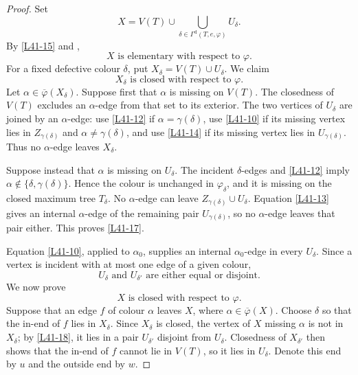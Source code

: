 \documentclass[11pt]{article}
\theoremstyle{definition}
\newcommand{\Dcol}{\Gamma^{\mathrm d}}
\newcommand{\set}[1]{\{#1\}}
\begin{document}
\begin{proof}
Set
\[
 X=V(T)\cup
   \bigcup_{\delta\in\Dcol(T,e,\varphi)}U_\delta.
\]
By \eqref{L41-15} and ,
\begin{equation}
 X\text{ is elementary with respect to }\varphi.
 \tag{16}\label{L41-16}
\end{equation}
For a fixed defective colour $\delta$, put
$X_\delta=V(T)\cup U_\delta$. We claim
\begin{equation}
 X_\delta\text{ is closed with respect to }\varphi.
 \tag{17}\label{L41-17}
\end{equation}
Let $\alpha\in\overline\varphi(X_\delta)$. Suppose first that $\alpha$ is
missing on $V(T)$. The closedness of $V(T)$ excludes an $\alpha$-edge from
that set to its exterior. The two vertices of $U_\delta$ are joined by an
$\alpha$-edge: use \eqref{L41-12} if
$\alpha=\gamma(\delta)$, use \eqref{L41-10} if its missing vertex lies in
$Z_{\gamma(\delta)}$ and $\alpha\ne\gamma(\delta)$, and use
\eqref{L41-14} if its missing vertex lies in
$U_{\gamma(\delta)}$. Thus no $\alpha$-edge leaves $X_\delta$.

Suppose instead that $\alpha$ is missing on $U_\delta$. The incident
$\delta$-edges and \eqref{L41-12} imply
$\alpha\notin\set{\delta,\gamma(\delta)}$. Hence the colour is unchanged
in $\varphi_\delta$, and it is missing on the closed maximum tree
$T_\delta$. No $\alpha$-edge can leave
$Z_{\gamma(\delta)}\cup U_\delta$. Equation \eqref{L41-13} gives an
internal $\alpha$-edge of the remaining pair
$U_{\gamma(\delta)}$, so no $\alpha$-edge leaves that pair either. This
proves \eqref{L41-17}.

Equation \eqref{L41-10}, applied to $\alpha_0$, supplies an internal
$\alpha_0$-edge in every $U_\delta$. Since a vertex is incident with at
most one edge of a given colour,
\begin{equation}
 U_\delta\text{ and }U_{\delta'}
 \text{ are either equal or disjoint.}
 \tag{18}\label{L41-18}
\end{equation}
We now prove
\begin{equation}
 X\text{ is closed with respect to }\varphi.
 \tag{19}\label{L41-19}
\end{equation}
Suppose that an edge $f$ of colour $\alpha$ leaves $X$, where
$\alpha\in\overline\varphi(X)$. Choose $\delta$ so that the in-end of $f$
lies in $X_\delta$. Since $X_\delta$ is closed, the vertex of $X$ missing
$\alpha$ is not in $X_\delta$; by \eqref{L41-18}, it lies in a pair
$U_{\delta'}$ disjoint from $U_\delta$. Closedness of $X_{\delta'}$ then
shows that the in-end of $f$ cannot lie in $V(T)$, so it lies in
$U_\delta$. Denote this end by $u$ and the outside end by $w$.


\end{proof}
\end{document}
